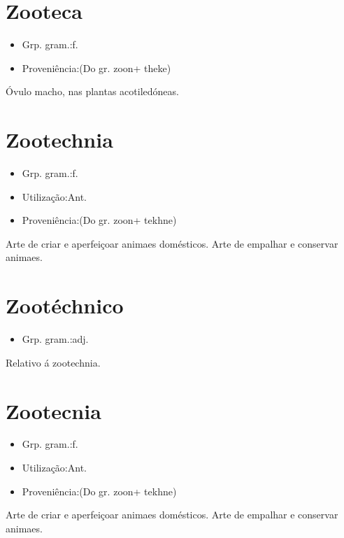 \section{Zooteca}
\begin{itemize}
\item {Grp. gram.:f.}
\end{itemize}
\begin{itemize}
\item {Proveniência:(Do gr. \textunderscore zoon\textunderscore  + \textunderscore theke\textunderscore )}
\end{itemize}
Óvulo macho, nas plantas acotiledóneas.
\section{Zootechnia}
\begin{itemize}
\item {Grp. gram.:f.}
\end{itemize}
\begin{itemize}
\item {Utilização:Ant.}
\end{itemize}
\begin{itemize}
\item {Proveniência:(Do gr. \textunderscore zoon\textunderscore  + \textunderscore tekhne\textunderscore )}
\end{itemize}
Arte de criar e aperfeiçoar animaes domésticos.
Arte de empalhar e conservar animaes.
\section{Zootéchnico}
\begin{itemize}
\item {Grp. gram.:adj.}
\end{itemize}
Relativo á zootechnia.
\section{Zootecnia}
\begin{itemize}
\item {Grp. gram.:f.}
\end{itemize}
\begin{itemize}
\item {Utilização:Ant.}
\end{itemize}
\begin{itemize}
\item {Proveniência:(Do gr. \textunderscore zoon\textunderscore  + \textunderscore tekhne\textunderscore )}
\end{itemize}
Arte de criar e aperfeiçoar animaes domésticos.
Arte de empalhar e conservar animaes.
